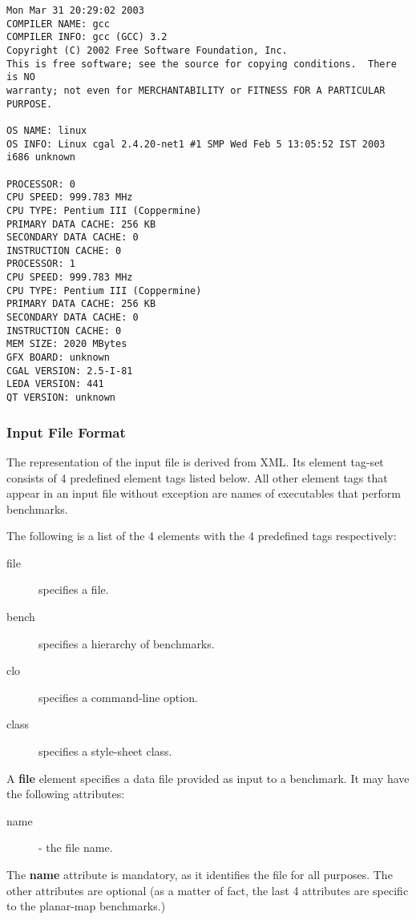 \begin{verbatim}
Mon Mar 31 20:29:02 2003
COMPILER NAME: gcc
COMPILER INFO: gcc (GCC) 3.2
Copyright (C) 2002 Free Software Foundation, Inc.
This is free software; see the source for copying conditions.  There is NO
warranty; not even for MERCHANTABILITY or FITNESS FOR A PARTICULAR PURPOSE.

OS NAME: linux
OS INFO: Linux cgal 2.4.20-net1 #1 SMP Wed Feb 5 13:05:52 IST 2003 i686 unknown

PROCESSOR: 0
CPU SPEED: 999.783 MHz
CPU TYPE: Pentium III (Coppermine)
PRIMARY DATA CACHE: 256 KB
SECONDARY DATA CACHE: 0
INSTRUCTION CACHE: 0
PROCESSOR: 1
CPU SPEED: 999.783 MHz
CPU TYPE: Pentium III (Coppermine)
PRIMARY DATA CACHE: 256 KB
SECONDARY DATA CACHE: 0
INSTRUCTION CACHE: 0
MEM SIZE: 2020 MBytes
GFX BOARD: unknown
CGAL VERSION: 2.5-I-81
LEDA VERSION: 441
QT VERSION: unknown
\end{verbatim}

\subsubsection{Input File Format}
The representation of the input file is derived from XML. Its element
tag-set consists of 4 predefined element tags listed below. All other
element tags that appear in an input file without exception are names
of executables that perform benchmarks.

The following is a list of the 4 elements with the 4 predefined tags
respectively:
\begin{description}
\item[file] specifies a file.
\item[bench] specifies a hierarchy of benchmarks.
\item[clo] specifies a command-line option.
\item[class] specifies a style-sheet class.
\end{description}

A \textbf{file} element specifies a data file provided as input to a
benchmark. It may have the following attributes:
\begin{description}
\item[name] - the file name.
\end{description}

The \textbf{name} attribute is mandatory, as it identifies the file
for all purposes. The other attributes are optional (as a matter of
fact, the last 4 attributes are specific to the planar-map benchmarks.)

